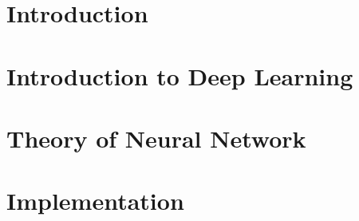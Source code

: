 \section[Intro]{Introduction}

 

 





\section[Intro]{Introduction to Deep Learning}
 

\section[Theory]{Theory of Neural Network}

\section[Libs]{Implementation}


% 







